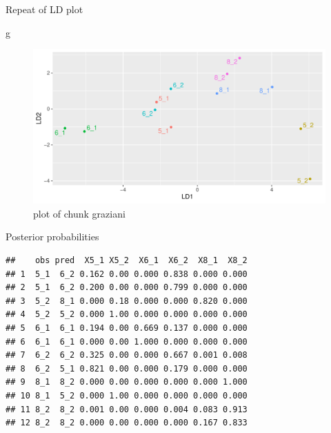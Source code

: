 \documentclass[ignorenonframetext,]{beamer}
\newenvironment{Shaded}{\begin{snugshade}}{\end{snugshade}}
\newcommand{\DataTypeTok}[1]{\textcolor[rgb]{0.13,0.29,0.53}{#1}}
\newcommand{\DecValTok}[1]{\textcolor[rgb]{0.00,0.00,0.81}{#1}}
\newcommand{\KeywordTok}[1]{\textcolor[rgb]{0.13,0.29,0.53}{\textbf{#1}}}
\newcommand{\NormalTok}[1]{#1}
\newcommand{\OperatorTok}[1]{\textcolor[rgb]{0.81,0.36,0.00}{\textbf{#1}}}
\newcommand{\StringTok}[1]{\textcolor[rgb]{0.31,0.60,0.02}{#1}}
\begin{document}
\begin{frame}[fragile]{Repeat of LD plot}
\protect\hypertarget{repeat-of-ld-plot}{}

\begin{Shaded}
\begin{Highlighting}[]
\NormalTok{g}
\end{Highlighting}
\end{Shaded}

\begin{figure}
\centering
\includegraphics{figure/graziani-1.pdf}
\caption{plot of chunk graziani}
\end{figure}

\end{frame}

\begin{frame}[fragile]{Posterior probabilities}
\protect\hypertarget{posterior-probabilities-2}{}

\footnotesize

\begin{Shaded}
\end{Shaded}

\begin{verbatim}
##    obs pred  X5_1 X5_2  X6_1  X6_2  X8_1  X8_2
## 1  5_1  6_2 0.162 0.00 0.000 0.838 0.000 0.000
## 2  5_1  6_2 0.200 0.00 0.000 0.799 0.000 0.000
## 3  5_2  8_1 0.000 0.18 0.000 0.000 0.820 0.000
## 4  5_2  5_2 0.000 1.00 0.000 0.000 0.000 0.000
## 5  6_1  6_1 0.194 0.00 0.669 0.137 0.000 0.000
## 6  6_1  6_1 0.000 0.00 1.000 0.000 0.000 0.000
## 7  6_2  6_2 0.325 0.00 0.000 0.667 0.001 0.008
## 8  6_2  5_1 0.821 0.00 0.000 0.179 0.000 0.000
## 9  8_1  8_2 0.000 0.00 0.000 0.000 0.000 1.000
## 10 8_1  5_2 0.000 1.00 0.000 0.000 0.000 0.000
## 11 8_2  8_2 0.001 0.00 0.000 0.004 0.083 0.913
## 12 8_2  8_2 0.000 0.00 0.000 0.000 0.167 0.833
\end{verbatim}

\normalsize

\end{frame}
\end{document}
